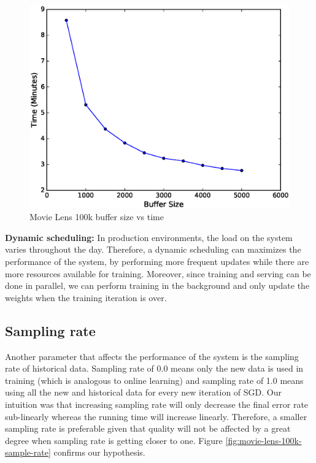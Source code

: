 \documentclass{sig-alternate-05-2015}
\begin{document}
\begin{figure}[H]
\centering
\includegraphics[width=\columnwidth]{../images/experiment-results/movie-lens-100k-buffer-time.eps}
\caption{Movie Lens 100k buffer size vs time}
\label{fig:movie-lens-100k-buffer-size-time}
\end{figure}

\textbf{Dynamic scheduling:} 
In production environments, the load on the system varies throughout the day. 
Therefore, a dynamic scheduling can maximizes the performance of the system, by performing more frequent updates while there are more resources available for training. 
Moreover, since training and serving can be done in parallel, we can perform training in the background and only update the weights when the training iteration is over. 

\subsection{Sampling rate}

Another parameter that affects the performance of the system is the sampling rate of historical data. 
Sampling rate of 0.0 means only the new data is used in training (which is analogous to online learning) and sampling rate of 1.0 means using all the new and historical data for every new iteration of SGD. 
Our intuition was that increasing sampling rate will only decrease the final error rate sub-linearly whereas the running time will increase linearly. 
Therefore, a smaller sampling rate is preferable given that quality will not be affected by a great degree when sampling rate is getting closer to one. 
Figure \ref{fig:movie-lens-100k-sample-rate} confirms our hypothesis. 
\end{document}
